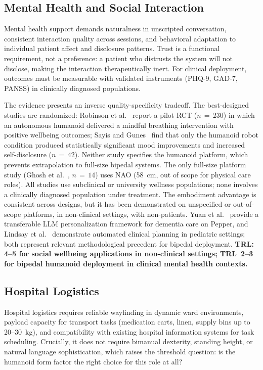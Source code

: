 \subsection{Mental Health and Social Interaction}
\label{sec:mentalhealth}

Mental health support demands naturalness in unscripted conversation, consistent
interaction quality across sessions, and behavioral adaptation to individual
patient affect and disclosure patterns. Trust is a functional requirement, not a
preference: a patient who distrusts the system will not disclose, making the
interaction therapeutically inert. For clinical deployment, outcomes must be
measurable with validated instruments (PHQ-9, GAD-7, PANSS) in clinically
diagnosed populations.

The evidence presents an inverse quality-specificity tradeoff. The
best-designed studies are randomized: Robinson et al.~\cite{robinson2023brief}
report a pilot RCT ($n\,=\,230$) in which an autonomous humanoid delivered a
mindful breathing intervention with positive wellbeing outcomes; Sayis and
Gunes~\cite{sayis2024technology} find that only the humanoid robot condition
produced statistically significant mood improvements and increased self-disclosure
($n\,=\,42$). Neither study specifies the humanoid platform, which prevents
extrapolation to full-size bipedal systems. The only full-size platform study
(Ghosh et al.~\cite{ghosh2024usercentered}, $n\,=\,14$) uses NAO (58~cm, out of
scope for physical care roles). All studies use subclinical or university wellness
populations; none involves a clinically diagnosed population under treatment. The
embodiment advantage is consistent across designs, but it has been demonstrated
on unspecified or out-of-scope platforms, in non-clinical settings, with
non-patients. Yuan et al.~\cite{yuan2025integrating} provide a transferable LLM
personalization framework for dementia care on Pepper, and Lindsay et
al.~\cite{lindsay2022socially} demonstrate automated clinical planning in
pediatric settings; both represent relevant methodological precedent for bipedal
deployment. \textbf{TRL: 4--5 for social wellbeing applications in non-clinical
settings; TRL~2--3 for bipedal humanoid deployment in clinical mental health
contexts.}

\subsection{Hospital Logistics}
\label{sec:logistics}

Hospital logistics requires reliable wayfinding in dynamic ward environments,
payload capacity for transport tasks (medication carts, linen, supply bins up to
20--30~kg), and compatibility with existing hospital information systems for task
scheduling. Crucially, it does not require bimanual dexterity, standing height,
or natural language sophistication, which raises the threshold question: is the
humanoid form factor the right choice for this role at all?

